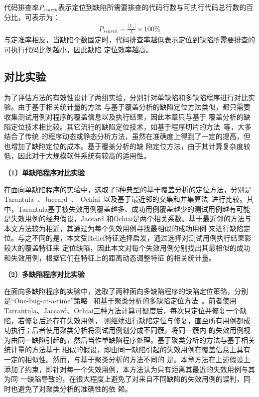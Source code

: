 代码排查率$P_{search}$表示定位到缺陷所需要排查的代码行数与可执行代码总行数的百分比，可表示为：
\begin{eqnarray}
      P_{search}=\frac{|L_s|}{L}\times100\%
\end{eqnarray}
与定准率相反，当缺陷个数固定时，代码排查率越低表示定位到缺陷所需要排查的可执行代码比例越小，因此缺陷
定位效率越高。

\subsection{对比实验}
为了评估方法的有效性设计了两组实验，分别针对单缺陷和多缺陷程序进行对比实验。由于基于相关统计量的方法
与基于覆盖分析的缺陷定位方法类似，都只需要收集测试用例对程序的覆盖信息以及执行结果，因此本章只与基于
覆盖分析的缺陷定位技术相比较。其它流行的缺陷定位技术，如基于程序切片的方法~\cite{}等，大多结合了传统
的程序动态或静态分析方法，虽然在准确度上得到了一定的提高，但也增加了缺陷定位的成本。基于覆盖分析的缺
陷定位方法，由于其计算复杂度较低，因此对于大规模软件系统有较高的适用性。

\textbf{（1）单缺陷程序对比实验}

在面向单缺陷程序的实验中，选取了5种典型的基于覆盖分析的定位方法，分别是
Tarantula~\cite{jones2005empirical}、Jaccard~\cite{abreu2007accuracy}、
Ochiai~\cite{abreu2007accuracy}以及基于最近邻的交集和并集算法~\cite{renieres2003fault}进行比较。其
中，Tarantula基于被失效用例覆盖越多、成功用例覆盖越少的测试用例越有可能是失效用例的经典假设，Jaccard
和Ochiai是两个相关系数。基于最近邻的方法与本文方法较为相近，其通过为每个失效用例寻找最相似的成功用例
来进行缺陷定位。与之不同的是，本文受Relief特征选择启发，通过选择对测试用例执行结果影较大的覆盖特征来
定位缺陷，因此本文对每个失效用例分别找出其最相似的成功和失效用例，根据它们在特征上的距离动态调整特征
的相关统计量。

\textbf{（2）多缺陷程序对比实验}

在面向多缺陷程序的实验中，选取了两种面向多缺陷程序的缺陷定位策略，分别是``One-bug-at-a-time''策略
~\cite{klahr1988cognitive}和基于聚类分析的多缺陷定位方法~\cite{jones2007debugging}。前者使用
Tarrantula、Jaccard、Ochiai三种方法计算可疑度后，每次只定位并修复一个缺陷，若修复后还存在失效用例，
则继续进行缺陷定位与修复，直至所有用例都成功执行；后者使用聚类分析将测试用例划分成不同簇，将同一簇内
的失效用例视为由同一缺陷引起的，然后当作单缺陷程序处理。基于聚类分析的方法与基于相关统计量的方法基于
相似的假设，即由同一缺陷引起的失效用例在覆盖信息上具有一定的相似性。然而，与基于聚类分析的方法不同的
是。本章方法在上述假设上添加了约束，即针对每一个失效用例，本方法认为只有距离其最近的失效用例与其为同
一缺陷导致的，在很大程度上避免了对来自不同缺陷的失效用例的误判，同时也避免了对聚类分析的准确性的依
赖。

